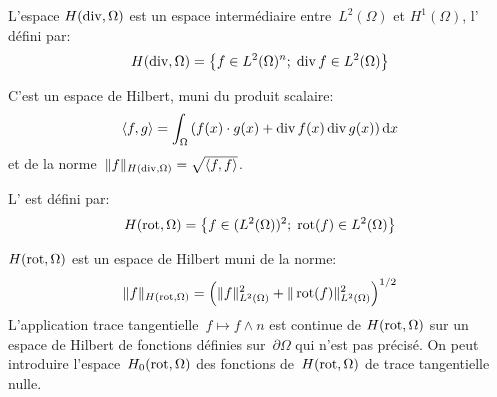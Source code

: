 \begin{definition}
L'espace $H(\operatorname{div},\Omega)$ est un espace intermédiaire entre~$L^2(\Omega)$ et $H^1(\Omega)$, l' défini par:
\begin{equation}
H(\operatorname{div},\Omega)=\left\{ f\in L^2(\Omega)^n;\; \operatorname{div} f\in L^2(\Omega)\right\}
\end{equation}
\end{definition}
C'est un espace de Hilbert, muni du produit scalaire:
\begin{equation}
\langle f,g \rangle = \displaystyle\int_\Omega \left( f(x)\cdot g(x)+\operatorname{div} f(x) \operatorname{div} g(x) \right) \text{d} x
\end{equation}
et de la norme~$\|f\|_{H(\operatorname{div},\Omega)}=\sqrt{\langle f,f\rangle}$.
\medskipvm
{}

\medskip
\begin{definition}
L' est défini par:
\begin{equation}
H(\operatorname{rot},\Omega) = \left\{ f\in (L^2(\Omega))^2;\; \operatorname{rot}(f) \in L^2(\Omega)\right\}
\end{equation}
\end{definition}
$H(\operatorname{rot},\Omega)$ est un espace de Hilbert muni de la norme:
\begin{equation}
\|f\|_{H(\operatorname{rot},\Omega)} = \left( \|f\|^2_{L^2(\Omega)} + \|\operatorname{rot}(f)\|^2_{L^2(\Omega)}\right)^{1/2}
\end{equation}
L'application trace tangentielle~$f \mapsto f \wedge n$ est continue de $H(\operatorname{rot},\Omega)$ sur un espace de Hilbert de fonctions définies sur~$\partial\Omega$ qui n'est pas précisé. On peut introduire l'espace~$H_0(\operatorname{rot},\Omega)$ des fonctions de~$H(\operatorname{rot},\Omega)$ de trace tangentielle nulle.
\medskipvm
{}


